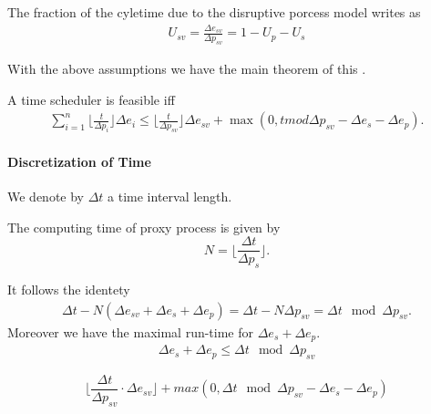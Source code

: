 	\begin{theorem}
	The fraction of the cyletime due to the disruptive porcess model writes as 
		\begin{subequations} 
		\begin{align}
		U_{sv} = \frac{\Delta e_{sv}}{\Delta p_{sv}} = 1 - U_p - U_s
		\end{align}
		\end{subequations}
	\end{theorem}
	
	With the above assumptions we have the main theorem of this \cite{K}.
	\begin{theorem}
	A time scheduler is feasible iff 
		\begin{align}
		\sum_{i=1}^n \lfloor \frac{t}{\Delta p_i} \rfloor \Delta e_i \leq \lfloor  \frac{t}{\Delta p_{sv}} \rfloor \Delta e_{sv} + \max (0,t  mod \Delta p_{sv} -\Delta e_{s} -\Delta e_p).
		\end{align}
	\end{theorem}
	
	\paragraph{Discretization of Time}
	\label{par:DiscretizationOfTime}
	We denote by $\Delta t$ a time interval length.  
	\begin{definition}
	The computing time of proxy process is given by 
	\begin{equation}
	N = \lfloor \frac{\Delta t}{\Delta p_s} \rfloor.
	\end{equation}
	\end{definition} 
	
	
	It follows the identety
	\begin{align}
	\Delta t - N ( \Delta e_{sv} + \Delta e_{s} + \Delta e_{p} ) = \Delta t - N \Delta p_{sv} = \Delta t \mod \Delta p_{sv}.
	\end{align}
	Moreover we have the maximal run-time for $\Delta e_s + \Delta e_p$.
	\begin{align}
	\Delta e_s + \Delta e_p \leq \Delta t \mod \Delta p_{sv}
	\end{align} 
	
	\begin{equation}
	\lfloor \frac{\Delta t}{ \Delta p_{sv}} \cdot \Delta e_{sv} \rfloor + max ( 0, \Delta t \mod \Delta p_{sv} - \Delta e_{s} - \Delta e_{p})
	\end{equation}
	 
